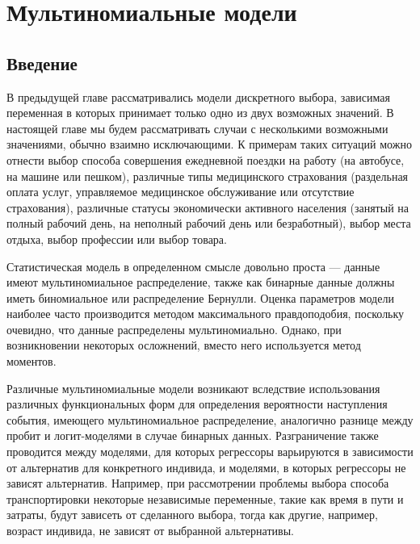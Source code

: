 
\chapter{Мультиномиальные модели}

\section{Введение}

В предыдущей главе рассматривались модели дискретного выбора, зависимая переменная в которых принимает только одно из двух возможных значений. В настоящей главе мы будем рассматривать случаи с несколькими возможными значениями, обычно взаимно исключающими. К примерам таких ситуаций можно отнести выбор способа совершения ежедневной поездки на работу (на автобусе, на машине или пешком), различные типы медицинского страхования (раздельная оплата услуг, управляемое медицинское обслуживание или отсутствие страхования), различные статусы экономически активного населения (занятый на полный рабочий день, на неполный рабочий день или безработный), выбор места отдыха, выбор профессии или выбор товара.

Статистическая модель в определенном смысле довольно проста --- данные имеют мультиномиальное распределение, также как бинарные данные должны иметь биномиальное или распределение Бернулли. Оценка параметров модели наиболее часто производится методом максимального правдоподобия, поскольку очевидно, что данные распределены мультиномиально. Однако, при возникновении некоторых осложнений, вместо него используется метод моментов.

Различные мультиномиальные модели возникают вследствие использования различных функциональных форм для определения вероятности наступления события, имеющего мультиномиальное распределение, аналогично разнице между пробит и логит-моделями в случае бинарных данных. Разграничение также проводится между моделями, для которых регрессоры варьируются в зависимости от альтернатив для конкретного индивида, и моделями, в которых регрессоры не зависят альтернатив. Например, при рассмотрении проблемы выбора способа транспортировки некоторые независимые переменные, такие как время в пути и затраты, будут зависеть от сделанного выбора, тогда как другие, например, возраст индивида, не зависят от выбранной альтернативы.

